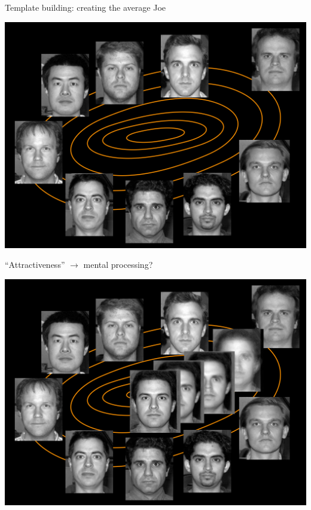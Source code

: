 \documentclass[ignorenonframetext,]{beamer}
\begin{document}
\begin{frame}{Template building: creating the average Joe}

\includegraphics{./papers/figures/template0.jpg}

\end{frame}

\begin{frame}{``Attractiveness'' \(\rightarrow\) mental processing?}

\includegraphics{./papers/figures/template1.jpg}

\end{frame}
\end{document}
